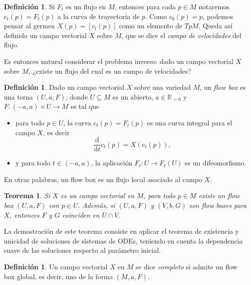 \documentclass[11pt, a4paper]{article}
\newcommand{\RR}{\mathbb{R}}
\newcommand{\dd}{\mathrm{d}}
\newcommand{\ddt}{\frac{\dd}{\dd t}}
\theoremstyle{plain}
\newtheorem{thm}[prop]{Teorema}
\theoremstyle{definition}
\newtheorem{defn}[prop]{Definición}
\begin{document}
\begin{defn} Si $F_t$ es un flujo en $M$, entonces para cada $p\in M$ notaremos $c_t(p)=F_t(p)$ a la curva de trayectoria de $p$. Como $c_0(p)=p$, podemos pensar al germen $X(p)=[c_t(p)]$ como un elemento de $TpM$. Queda así definido un campo vectorial $X$ sobre $M$, que se dice el \emph{campo de velocidades} del flujo.
\end{defn}

Es entonces natural considerar el problema inverso: dado un campo vectorial $X$ sobre $M$, ¿existe un flujo del cual es un campo de velocidades?

\begin{defn} Dado un campo vectorial $X$ sobre una variedad $M$, un \emph{flow box} es una terna $(U,a,F)$, donde $U\subseteq M$ es un abierto, $a\in\RR_{>0}$ y $F:(-a,a)\times U\to M$ es tal que
\begin{itemize}
\item para todo $p\in U$, la curva $c_t(p) = F_t(p)$ es una curva integral para el campo $X$, es decir
\[\ddt c_t(p) = X(c_t(p)),\]
\item y para todo $t\in (-a,a)$, la aplicación $F_t:U\to F_t(U)$ es un difeomorfismo.
\end{itemize}
En otras palabras, un flow box es un flujo local asociado al campo $X$.
\end{defn}
\begin{thm} Si $X$ es un campo vectorial en $M$, para todo $p\in M$ existe un flow box $(U,a,F)$ con $p\in U$. Además, si $(U,a,F)$ y $(V,b,G)$ son flow boxes para $X$, entonces $F$ y $G$ coinciden en $U\cap V$.\hfill\qedsymbol
\end{thm}

La demostración de este teorema consiste en aplicar el teorema de existencia y unicidad de soluciones de sistemas de ODEs, teniendo en cuenta la dependencia suave de las soluciones respecto al parámetro inicial.

\begin{defn} Un campo vectorial $X$ en $M$ se dice \emph{completo} si admite un flow box global, es decir, uno de la forma $(M,a,F)$.
\end{defn}
\end{document}
